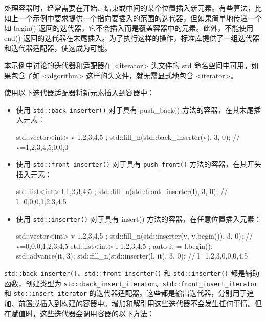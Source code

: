 处理容器时，经常需要在开始、结束或中间的某个位置插入新元素。有些算法，比如上一个示例中要求提供一个指向要插入的范围的迭代器，但如果简单地传递一个如 begin() 返回的迭代器，它不会插入而是覆盖容器中的元素。此外，不能使用 end() 返回的迭代器在末尾插入。为了执行这样的操作，标准库提供了一组迭代器和迭代器适配器，使这成为可能。


本示例中讨论的迭代器和适配器在 <iterator> 头文件的 std 命名空间中可用。如果包含了如 <algorithm> 这样的头文件，就无需显式地包含 <iterator>。


使用以下迭代器适配器将新元素插入到容器中：

\begin{itemize}
\item
使用 \verb|std::back_inserter()| 对于具有 push\_back() 方法的容器，在其末尾插入元素：

\begin{cpp}
std::vector<int> v{ 1,2,3,4,5 };
std::fill_n(std::back_inserter(v), 3, 0);
// v={1,2,3,4,5,0,0,0}
\end{cpp}

\item
使用 \verb|std::front_inserter()| 对于具有 \verb|push_front()| 方法的容器，在其开头插入元素：

\begin{cpp}
std::list<int> l{ 1,2,3,4,5 };
std::fill_n(std::front_inserter(l), 3, 0);
// l={0,0,0,1,2,3,4,5}
\end{cpp}

\item
使用 \verb|std::inserter()| 对于具有 insert() 方法的容器，在任意位置插入元素：

\begin{cpp}
std::vector<int> v{ 1,2,3,4,5 };
std::fill_n(std::inserter(v, v.begin()), 3, 0);
// v={0,0,0,1,2,3,4,5}
std::list<int> l{ 1,2,3,4,5 };
auto it = l.begin();
std::advance(it, 3);
std::fill_n(std::inserter(l, it), 3, 0);
// l={1,2,3,0,0,0,4,5}
\end{cpp}
\end{itemize}


\verb|std::back_inserter()|、\verb|std::front_inserter()| 和 \verb|std::inserter()| 都是辅助函数，创建类型为 \verb|std::back_insert_iterator|、\verb|std::front_insert_iterator| 和 \verb|std::insert_iterator| 的迭代器适配器。这些都是输出迭代器，分别用于追加、前置或插入到构建的容器中。增加和解引用这些迭代器不会发生任何事情。但在赋值时，这些迭代器会调用容器的以下方法：

